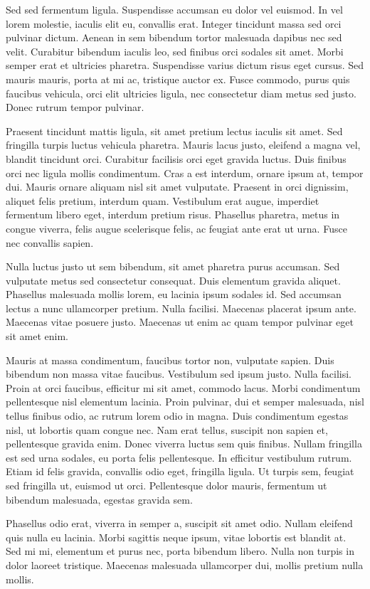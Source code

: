 \documentclass[10pt]{article}
\begin{document}
Sed sed fermentum ligula. Suspendisse accumsan eu dolor vel euismod. In vel
lorem molestie, iaculis elit eu, convallis erat. Integer tincidunt massa sed
orci pulvinar dictum. Aenean in sem bibendum tortor malesuada dapibus nec sed
velit. Curabitur bibendum iaculis leo, sed finibus orci sodales sit amet. Morbi
semper erat et ultricies pharetra. Suspendisse varius dictum risus eget cursus.
Sed mauris mauris, porta at mi ac, tristique auctor ex. Fusce commodo, purus
quis faucibus vehicula, orci elit ultricies ligula, nec consectetur diam metus
sed justo. Donec rutrum tempor pulvinar.

Praesent tincidunt mattis ligula, sit amet pretium lectus iaculis sit amet. Sed
fringilla turpis luctus vehicula pharetra. Mauris lacus justo, eleifend a magna
vel, blandit tincidunt orci. Curabitur facilisis orci eget gravida luctus. Duis
finibus orci nec ligula mollis condimentum. Cras a est interdum, ornare ipsum
at, tempor dui. Mauris ornare aliquam nisl sit amet vulputate. Praesent in orci
dignissim, aliquet felis pretium, interdum quam. Vestibulum erat augue,
imperdiet fermentum libero eget, interdum pretium risus. Phasellus pharetra,
metus in congue viverra, felis augue scelerisque felis, ac feugiat ante erat ut
urna. Fusce nec convallis sapien.

Nulla luctus justo ut sem bibendum, sit amet pharetra purus accumsan. Sed
vulputate metus sed consectetur consequat. Duis elementum gravida aliquet.
Phasellus malesuada mollis lorem, eu lacinia ipsum sodales id. Sed accumsan
lectus a nunc ullamcorper pretium. Nulla facilisi. Maecenas placerat ipsum
ante. Maecenas vitae posuere justo. Maecenas ut enim ac quam tempor pulvinar
eget sit amet enim.

Mauris at massa condimentum, faucibus tortor non, vulputate sapien. Duis
bibendum non massa vitae faucibus. Vestibulum sed ipsum justo. Nulla facilisi.
Proin at orci faucibus, efficitur mi sit amet, commodo lacus. Morbi condimentum
pellentesque nisl elementum lacinia. Proin pulvinar, dui et semper malesuada,
nisl tellus finibus odio, ac rutrum lorem odio in magna. Duis condimentum
egestas nisl, ut lobortis quam congue nec. Nam erat tellus, suscipit non sapien
et, pellentesque gravida enim. Donec viverra luctus sem quis finibus. Nullam
fringilla est sed urna sodales, eu porta felis pellentesque. In efficitur
vestibulum rutrum. Etiam id felis gravida, convallis odio eget, fringilla
ligula. Ut turpis sem, feugiat sed fringilla ut, euismod ut orci. Pellentesque
dolor mauris, fermentum ut bibendum malesuada, egestas gravida sem.

Phasellus odio erat, viverra in semper a, suscipit sit amet odio. Nullam
eleifend quis nulla eu lacinia. Morbi sagittis neque ipsum, vitae lobortis est
blandit at. Sed mi mi, elementum et purus nec, porta bibendum libero. Nulla non
turpis in dolor laoreet tristique. Maecenas malesuada ullamcorper dui, mollis
pretium nulla mollis. 
\end{document}
